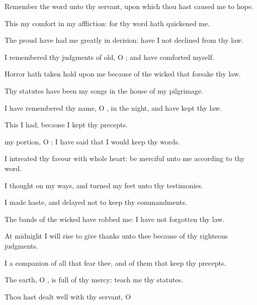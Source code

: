 {\par }{\Q {}Remember the
word unto thy
servant, upon which thou hast caused me to
hope.
\par }{\Q {}This
{} my
comfort in my
affliction: for thy
word hath
quickened me.
\par }{\Q {}The
proud have had me
greatly in
derision:
{} have I not
declined from thy
law.
\par }{\Q {}I
remembered thy
judgments of
old, O
{}; and have
comforted myself.
\par }{\Q {}Horror hath taken
hold upon me because of the
wicked that
forsake thy
law.
\par }{\Q {}Thy
statutes have been my
songs in the
house of my
pilgrimage.
\par }{\BB \par }{\Q {}I have
remembered thy
name, O
{}, in the
night, and have
kept thy
law.
\par }{\Q {}This I had, because I
kept thy
precepts.
\par }{
\par }{\Q {} my
portion, O
{}: I have
said that I would
keep thy
words.
\par }{\Q {}I
intreated thy
favour with
{} whole
heart: be
merciful unto me according to thy
word.
\par }{\BB \par }{\Q {}I
thought on my
ways, and
turned my
feet unto thy
testimonies.
\par }{\Q {}I made
haste, and
delayed not to
keep thy
commandments.
\par }{\Q {}The
bands of the
wicked have
robbed me:
{} I have not
forgotten thy
law.
\par }{\Q {}At
midnight I will
rise to give
thanks unto thee because of thy
righteous
judgments.
\par }{\Q {}I
{} a
companion of all
{} that
fear thee, and of them that
keep thy
precepts.
\par }{\Q {}The
earth, O
{}, is
full of thy
mercy:
teach me thy
statutes.
\par }{\BB \par }{
\par }{\Q {}Thou hast
dealt
well with thy
servant, O
}
